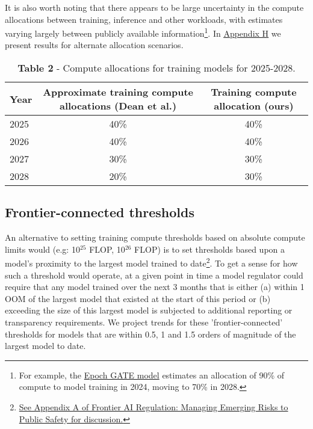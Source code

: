 \documentclass[11pt]{article}
\begin{document}
It is also worth noting that there appears to be large uncertainty in the compute allocations between training, inference and other workloads, with estimates varying largely between publicly available information\footnote{For example, the \href{https://epoch.ai/gate}{Epoch GATE model} estimates an allocation of 90\% of compute to model training in 2024, moving to 70\% in 2028.}. In \underline{\hyperref[appendix-h---results-for-alternate-training-compute-allocations]{Appendix H}} we present results for alternate allocation scenarios.

\begin{table}[h]
\centering
\caption*{\textbf{Table 2} - Compute allocations for training models for 2025-2028.}
\label{table-2---compute-allocations-for-training-models-for-2025-2028.}
\begin{tabular}{|l|c|c|}
\hline
Year & Approximate training compute allocations (Dean et al.) & Training compute allocation (ours) \\
\hline
2025 & 40\% & 40\% \\
2026 & 40\% & 40\% \\
2027 & 30\% & 30\% \\
2028 & 20\% & 30\% \\
\hline
\end{tabular}
\end{table}

\subsection{Frontier-connected thresholds}
\label{frontier-connected-thresholds}

An alternative to setting training compute thresholds based on absolute compute limits would (e.g: 10$^{25}$ FLOP, 10$^{26}$ FLOP) is to set thresholds based upon a model's proximity to the largest model trained to date\footnote{\href{https://arxiv.org/pdf/2307.03718}{See Appendix A of Frontier AI Regulation: Managing Emerging Risks to Public Safety for discussion.}}. To get a sense for how such a threshold would operate, at a given point in time a model regulator could require that any model trained over the next 3 months that is either (a) within 1 OOM of the largest model that existed at the start of this period or (b) exceeding the size of this largest model is subjected to additional reporting or transparency requirements. We project trends for these 'frontier-connected' thresholds for models that are within 0.5, 1 and 1.5 orders of magnitude of the largest model to date.
\end{document}
